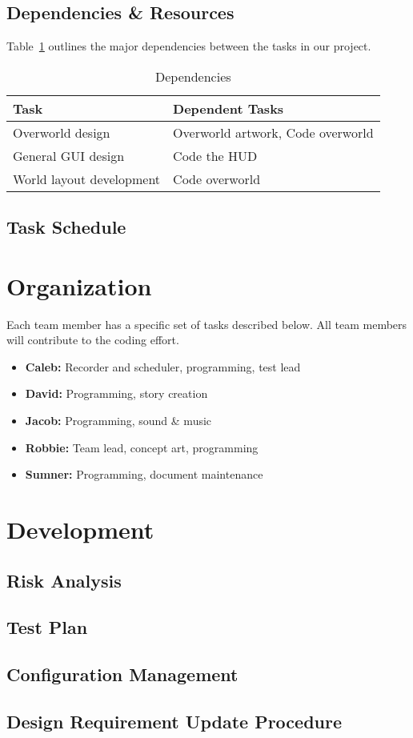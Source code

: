 \documentclass[12pt,titlepage]{article}
\begin{document}
\subsection{Dependencies \& Resources}
Table~\ref{tab:dependencies} outlines the major dependencies between the tasks
in our project.
\begin{table}[H]
    \caption{Dependencies}
    \label{tab:dependencies}
    \centering
    \begin{tabularx}{\linewidth}{|l|X|}
        \hline
        \textbf{Task} & \textbf{Dependent Tasks} \\
        \hline
        Overworld design & Overworld artwork, Code overworld \\
        General GUI design & Code the HUD \\
        World layout development & Code overworld \\
        \hline
    \end{tabularx}
\end{table}

\subsection{Task Schedule}

\section{Organization}
Each team member has a specific set of tasks described below. All team members
will contribute to the coding effort.
\begin{itemize}
    \item \textbf{Caleb:} Recorder and scheduler, programming, test lead
    \item \textbf{David:} Programming, story creation
    \item \textbf{Jacob:} Programming, sound \& music
    \item \textbf{Robbie:} Team lead, concept art, programming
    \item \textbf{Sumner:} Programming, document maintenance
\end{itemize}

\section{Development}

\subsection{Risk Analysis}

\subsection{Test Plan}

\subsection{Configuration Management}

\subsection{Design Requirement Update Procedure}
\end{document}
